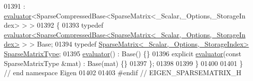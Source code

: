 \begin{DoxyCode}
01391   : \hyperlink{struct_eigen_1_1internal_1_1evaluator}{evaluator}<SparseCompressedBase<SparseMatrix<\_Scalar,\_Options,\_StorageIndex> > >
01392 \{
01393   \textcolor{keyword}{typedef} 
      \hyperlink{struct_eigen_1_1internal_1_1evaluator}{evaluator<SparseCompressedBase<SparseMatrix<\_Scalar,\_Options,\_StorageIndex>}
       > > Base;
01394   \textcolor{keyword}{typedef} \hyperlink{group___sparse_core___module_class_eigen_1_1_sparse_matrix}{SparseMatrix<\_Scalar,\_Options,\_StorageIndex>} 
      \hyperlink{group___sparse_core___module_class_eigen_1_1_sparse_matrix}{SparseMatrixType};
01395   \hyperlink{struct_eigen_1_1internal_1_1evaluator}{evaluator}() : Base() \{\}
01396   \textcolor{keyword}{explicit} \hyperlink{struct_eigen_1_1internal_1_1evaluator}{evaluator}(\textcolor{keyword}{const} SparseMatrixType &mat) : Base(mat) \{\}
01397 \};
01398 
01399 \}
01400 
01401 \} \textcolor{comment}{// end namespace Eigen}
01402 
01403 \textcolor{preprocessor}{#endif // EIGEN\_SPARSEMATRIX\_H}
\end{DoxyCode}
